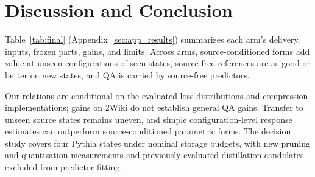 \section{Discussion and Conclusion}
\label{sec:discussion}

Table~\ref{tab:final} (Appendix~\ref{sec:app_results}) summarizes each arm's delivery, inputs, frozen parts, gains, and limits. Across arms, source-conditioned forms add value at unseen configurations of seen states, source-free references are as good or better on new states, and QA is carried by source-free predictors.

Our relations are conditional on the evaluated loss distributions and
compression implementations; gains on 2Wiki do not establish general QA gains. Transfer to unseen source
states remains uneven, and simple configuration-level response
estimates can outperform source-conditioned parametric forms. The decision study covers four Pythia states under nominal storage
budgets, with new pruning and quantization measurements and
previously evaluated distillation candidates excluded from predictor
fitting.
